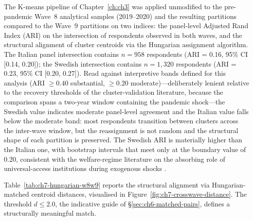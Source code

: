 The K-means pipeline of Chapter~\ref{ch:ch3} was applied unmodified to the pre-pandemic Wave~8 analytical samples (2019--2020) and the resulting partitions compared to the Wave~9 partitions on two indices: the panel-level Adjusted Rand Index (ARI) on the intersection of respondents observed in both waves, and the structural alignment of cluster centroids via the Hungarian assignment algorithm. The Italian panel intersection contains $n = 958$ respondents (ARI = 0.16, 95\% CI [0.14, 0.20]); the Swedish intersection contains $n = 1{,}320$ respondents (ARI = 0.23, 95\% CI [0.20, 0.27]). Read against interpretive bands defined for this analysis (ARI $\geq 0.40$ substantial, $\geq 0.20$ moderate)---deliberately lenient relative to the recovery thresholds of the cluster-validation literature, because the comparison spans a two-year window containing the pandemic shock---the Swedish value indicates moderate panel-level agreement and the Italian value falls below the moderate band: most respondents transition between clusters across the inter-wave window, but the reassignment is not random and the structural shape of each partition is preserved. The Swedish ARI is materially higher than the Italian one, with bootstrap intervals that meet only at the boundary value of 0.20, consistent with the welfare-regime literature on the absorbing role of universal-access institutions during exogenous shocks \citep{bambra2007}.

Table~\ref{tab:ch7-hungarian-w8w9} reports the structural alignment via Hungarian-matched centroid distances, visualised in Figure~\ref{fig:ch7-crosswave-distance}. The threshold $d \leq 2.0$, the indicative guide of \S\ref{sec:ch6-matched-pairs}, defines a structurally meaningful match.

